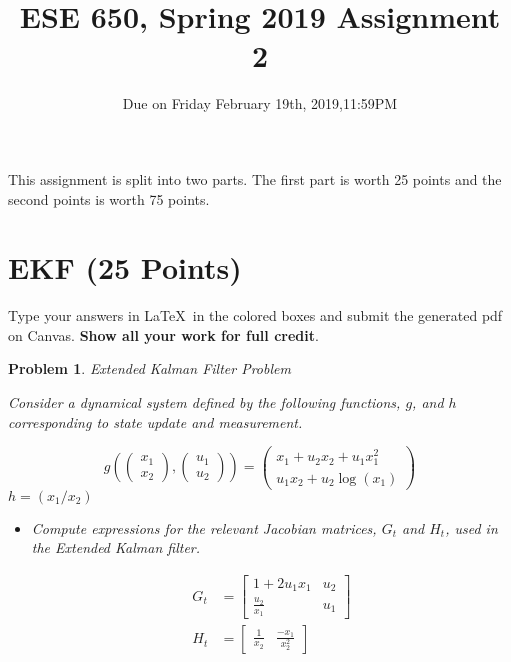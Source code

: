 \documentclass{article}
\title{ESE 650, Spring 2019 Assignment 2}
\date{Due on Friday February 19th, 2019,11:59PM}
\newtheorem{problem}{Problem}
\begin{document}
\maketitle
This assignment is split into two parts. The first part is worth 25 points and the second points is worth 75 points. 
\section{EKF (25 Points)}
Type your answers in \LaTeX\ in the colored boxes and submit the generated pdf on Canvas.  \textbf{Show all your work for full credit}. 


\begin{problem}
Extended Kalman Filter Problem

Consider a dynamical system defined by the following functions, $g$, and $h$ corresponding to state update and measurement.

\[
g \left( 
\begin{pmatrix} x_1 \\ x_2 \end{pmatrix},
\begin{pmatrix} u_1 \\ u_2 \end{pmatrix}
\right) 
= \begin{pmatrix}
x_1 + u_2 x_2 + u_1 x_1^2 \\
u_1 x_2 + u_2 \log (x_1)
 \end{pmatrix}
\]
$h = (x_1 / x_2)$
\begin{itemize}

\item Compute expressions for the relevant Jacobian matrices, $G_t$ and $H_t$, used in the Extended Kalman filter.

\begin{tcolorbox}
\begin{align*}
 G_t &= \begin{bmatrix}
         1+2u_1x_1 & u_2
         \\
         \frac{u_2}{x_1} & u_1
        \end{bmatrix}
\\
H_t &= \begin{bmatrix}
        \frac{1}{x_2}
        &
       \frac{- x_1}{x^2_2}
       \end{bmatrix}
\end{align*}




\end{tcolorbox}


\end{itemize}
\end{problem}
\end{document}

